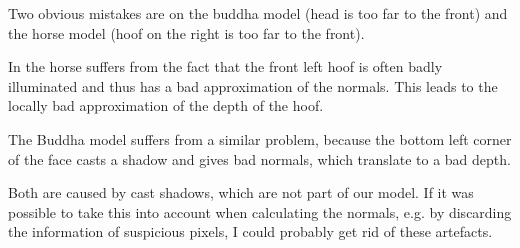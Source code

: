 \documentclass{paper}
\begin{document}
Two obvious mistakes are on the buddha model (head is too far to the front) and the horse model (hoof on the right is too far to the front).

In the horse suffers from the fact that the front left hoof is often badly illuminated and thus has a bad approximation of the normals. This leads to the locally bad approximation of the depth of the hoof.

The Buddha model suffers from a similar problem, because the bottom left corner of the face casts a shadow and gives bad normals, which translate to a bad depth.

Both are caused by cast shadows, which are not part of our model. If it was possible to take this into account when calculating the normals, e.g. by discarding the information of suspicious pixels, I could probably get rid of these artefacts.
 
\end{document}
